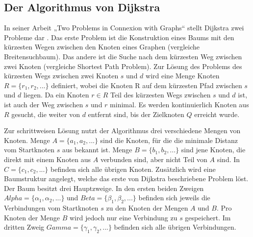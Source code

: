 \subsection{Der Algorithmus von Dijkstra}
In seiner Arbeit „Two Problems in Connexion with Graphs“ stellt Dijkstra zwei Probleme dar \cite{Dijkstra.1959}. Das erste Problem ist die Konstruktion eines Baums mit den kürzesten Wegen zwischen den Knoten eines Graphen (vergleiche Breitensuchbaum). Das andere ist die Suche nach dem kürzesten Weg zwischen zwei Knoten (vergleiche Shortest Path Problem).
Zur Lösung des Problems des kürzesten Wegs zwischen zwei Knoten $s$ und $d$ wird eine Menge Knoten $R = \{r_1, r_2, ...\}$ definiert, wobei die Knoten R auf dem kürzesten Pfad zwischen $s$ und $d$ liegen. %
Da ein Knoten $r \in R$ Teil des kürzesten Wegs zwischen $s$ und $d$ ist, ist auch der Weg zwischen $s$ und $r$ minimal. Es werden kontinuierlich Knoten aus $R$ gesucht, die weiter von $d$ entfernt sind, bis der Zielknoten $Q$ erreicht wurde.

Zur schrittweisen Lösung nutzt der Algorithmus drei verschiedene Mengen von Knoten. Menge $A = \{a_1, a_2, ...\}$ sind die Knoten, für die die minimale Distanz vom Startknoten $s$ aus bekannt ist. Menge $B = \{b_1, b_2, ...\}$ sind jene Knoten, die direkt mit einem Knoten aus $A$ verbunden sind, aber nicht Teil von $A$ sind. In $C = \{c_1, c_2, ...\}$ befinden sich alle übrigen Knoten.
Zusätzlich wird eine Baumstruktur angelegt, welche das erste von Dijkstra beschriebene Problem löst. Der Baum besitzt drei Hauptzweige. In den ersten beiden Zweigen $Alpha = \{\alpha_1, \alpha_2, ...\}$ und $Beta = \{\beta_1, \beta_2, ...\}$ befinden sich jeweils die Verbindungen vom Startknoten $s$ zu den Knoten der Mengen $A$ und $B$. Pro Knoten der Menge $B$ wird jedoch nur eine Verbindung zu $s$ gespeichert. Im dritten Zweig $Gamma = \{\gamma_1, \gamma_2, ...\}$ befinden sich alle übrigen Verbindungen. 

